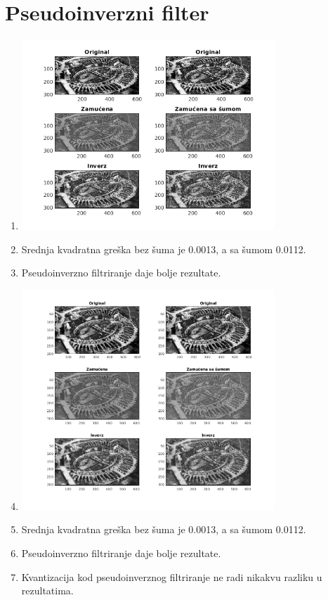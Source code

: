 \documentclass[12pt, a4]{report}
\begin{document}
\section{Pseudoinverzni filter}
\begin{enumerate}
	\item
	      \begin{minipage}{\linewidth}
		      \centering
		      \includegraphics[width=0.75\textwidth]{pseudoinverse}
	      \end{minipage}
	\item
	      Srednja kvadratna greška bez šuma je 0.0013, a sa šumom 0.0112.
	\item
	      Pseudoinverzno filtriranje daje bolje rezultate.
	\item
	      \begin{minipage}{\linewidth}
		      \centering
		      \includegraphics[width=0.75\textwidth]{pseudoinversequant}
	      \end{minipage}
	\item
	      Srednja kvadratna greška bez šuma je 0.0013, a sa šumom 0.0112.
	\item
	      Pseudoinverzno filtriranje daje bolje rezultate.
	\item
	      Kvantizacija kod pseudoinverznog filtriranje ne radi nikakvu razliku u rezultatima.
\end{enumerate}
\end{document}
